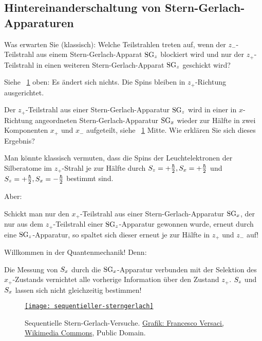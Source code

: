 \subsection{Hintereinanderschaltung von Stern-Gerlach-Apparaturen}
\begin{frage}
 Was erwarten Sie (klassisch): Welche Teilstrahlen treten auf, wenn der $z_-$-Teilstrahl aus einem Stern-Gerlach-Apparat $\text{SG}_z$ blockiert wird und nur der $z_+$-Teilstrahl in einen weiteren Stern-Gerlach-Apparat $\text{SG}_z$ geschickt wird?
\end{frage}
\begin{obs}
 Siehe \figurename{}~\ref{fig:seqSQ} oben: Es \"andert sich nichts. Die Spins bleiben in $z_+$-Richtung ausgerichtet.
\end{obs}

\begin{frage}
 Der $z_+$-Teilstrahl aus einer Stern-Gerlach-Apparatur $\text{SG}_z$ wird in einer in $x$-Richtung angeordneten Stern-Gerlach-Apparatur $\text{SG}_x$ wieder zur H\"alfte in zwei Komponenten $x_+$ und $x_-$ aufgeteilt, siehe \figurename{}~\ref{fig:seqSQ} Mitte. Wie erkl\"aren Sie sich dieses Ergebnis?
\end{frage}
Man k\"onnte klassisch vermuten, dass die Spins der Leuchtelektronen der Silberatome im $z_+$-Strahl je zur H\"alfte durch $S_z = +\frac{\hbar}{2}, S_x = +\frac{\hbar}{2}$ und $S_z = +\frac{\hbar}{2}, S_x = -\frac{\hbar}{2}$ bestimmt sind.

Aber:
\begin{obs}
Schickt man nur den $x_+$-Teilstrahl aus einer Stern-Gerlach-Apparatur $\text{SG}_x$, der nur aus dem $z_+$-Teilstrahl einer $\text{SG}_z$-Apparatur gewonnen wurde, erneut durch eine $\text{SG}_z$-Apparatur, so spaltet sich dieser erneut je zur H\"alfte in $z_+$ und $z_-$ auf!
\end{obs}

Willkommen in der Quantenmechanik! Denn:
\begin{erg}
 Die Messung von $S_x$ durch die $\text{SG}_x$-Apparatur verbunden mit der Selektion des $x_+$-Zustands vernichtet alle vorherige Information \"uber den Zustand $z_+$. $S_z$ und $S_x$ lassen sich nicht gleichzeitig bestimmen!
\end{erg}

\begin{figure}
 \href{http://commons.wikimedia.org/wiki/File:Sg-seq.svg}{\texttt{[image: sequentieller-sterngerlach]}}
\caption{\label{fig:seqSQ}Sequentielle Stern-Gerlach-Versuche. \href{http://commons.wikimedia.org/wiki/File:Sg-seq.svg}{Grafik: Francesco Versaci, Wikimedia Commons}, Public Domain.}
\end{figure}